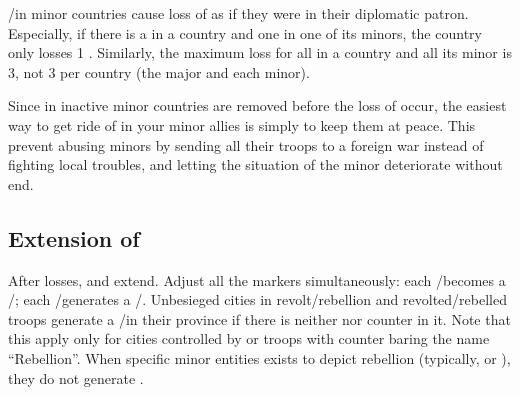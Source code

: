 \aparag \REVOLT/\REBELLION in minor countries cause loss of \STAB as if they
were in their diplomatic patron.
\bparag Especially, if there is a \REVOLT\Facemoins in a country and one in
one of its minors, the country only losses 1 \STAB.
\bparag Similarly, the maximum loss for all \REVOLT in a country and all its
minor is 3, not 3 per country (the major and each minor).

\begin{designnote}
  Since \REVOLT in inactive minor countries are removed before the loss of
  \STAB occur, the easiest way to get ride of \REVOLT in your minor allies is
  simply to keep them at peace. This prevent abusing minors by sending all
  their troops to a foreign war instead of fighting local troubles, and
  letting the situation of the minor deteriorate without end.
\end{designnote}

\subsection{Extension of \REVOLT}
\label{chRedep:Extension Revolts}
 After \STAB losses, \REVOLT and \REBELLION extend. Adjust
all the markers simultaneously:
\bparag each \REVOLT/\REBELLION\facemoins becomes a
\REVOLT/\REBELLION\faceplus;
\bparag each \REVOLT/\REBELLION\faceplus generates a
\REVOLT/\REBELLION\facemoins.
\bparag Unbesieged cities in revolt/rebellion and revolted/rebelled troops
generate a \REVOLT/\REBELLION\facemoins in their province if there is neither
\REVOLT nor \REBELLION counter in it.
\bparag Note that this apply only for cities controlled by or troops with
counter baring the name ``Rebellion''. When specific minor entities exists to
depict rebellion (typically,  or ), they do
not generate \REBELLION.

